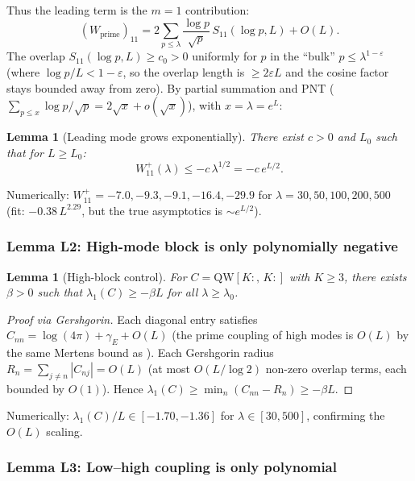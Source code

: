 \documentclass[12pt,a4paper]{article}
\newtheorem{lemma}[theorem]{Lemma}
\theoremstyle{definition}
\theoremstyle{remark}
\begin{document}
Thus the leading term is the $m = 1$ contribution:
\begin{equation}
\label{eq:W11-m1}
  (W_{\mathrm{prime}})_{11} = 2\sum_{p \leq \lambda} \frac{\log p}{\sqrt{p}}\,S_{11}(\log p, L) + O(L).
\end{equation}
The overlap $S_{11}(\log p, L) \geq c_0 > 0$ uniformly for $p$ in the ``bulk'' $p \leq \lambda^{1-\varepsilon}$ (where $\log p / L < 1 - \varepsilon$, so the overlap length is $\geq 2\varepsilon L$ and the cosine factor stays bounded away from zero). By partial summation and PNT ($\sum_{p \leq x} \log p / \sqrt{p} = 2\sqrt{x} + o(\sqrt{x})$), with $x = \lambda = e^L$:

\begin{lemma}[Leading mode grows exponentially]
\label{lem:L1}
There exist $c > 0$ and $L_0$ such that for $L \geq L_0$:
\[
  W_{11}^+(\lambda) \leq -c\,\lambda^{1/2} = -c\,e^{L/2}.
\]
\end{lemma}

\noindent Numerically: $W_{11}^+ = -7.0, -9.3, -9.1, -16.4, -29.9$ for $\lambda = 30, 50, 100, 200, 500$ (fit: $-0.38\,L^{2.29}$, but the true asymptotics is $\sim e^{L/2}$).

\subsubsection{Lemma L2: High-mode block is only polynomially negative}

\begin{lemma}[High-block control]
\label{lem:L2}
For $C = \mathrm{QW}[K{:},\,K{:}]$ with $K \geq 3$, there exists $\beta > 0$ such that $\lambda_1(C) \geq -\beta L$ for all $\lambda \geq \lambda_0$.
\end{lemma}
\begin{proof}[Proof via Gershgorin]
Each diagonal entry satisfies $C_{nn} = \log(4\pi) + \gamma_E + O(L)$ (the prime coupling of high modes is $O(L)$ by the same Mertens bound as ). Each Gershgorin radius $R_n = \sum_{j \neq n} |C_{nj}| = O(L)$ (at most $O(L/\log 2)$ non-zero overlap terms, each bounded by $O(1)$). Hence $\lambda_1(C) \geq \min_n(C_{nn} - R_n) \geq -\beta L$.
\end{proof}

\noindent Numerically: $\lambda_1(C)/L \in [-1.70, -1.36]$ for $\lambda \in [30, 500]$, confirming the $O(L)$ scaling.

\subsubsection{Lemma L3: Low--high coupling is only polynomial}
\end{document}
